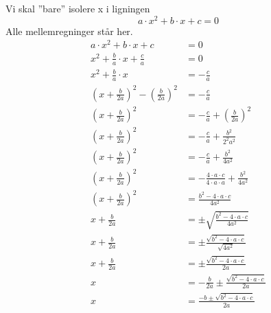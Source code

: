 \documentclass[a4paper, 12pt]{article}
\date{}
\title{}
\begin{document}
Vi skal ''bare'' isolere x i ligningen
$$a\cdot x^2 + b \cdot x + c = 0$$
Alle mellemregninger står her.
\begin{align*}
a\cdot x^2 + b \cdot x + c &= 0 \\
x^2 + \frac{b}{a} \cdot x +\frac{c}{a}&=0  \\
x^2 + \frac{b}{a} \cdot x &= -\frac{c}{a}  \\
\left( x + \frac{b}{2 a} \right)^2 - \left( \frac{b}{2 a} \right)^2 &= - \frac{c}{a} \\
\left( x + \frac{b}{2 a} \right)^2  &= - \frac{c}{a}+\left( \frac{b}{2 a} \right)^2  \\
\left( x + \frac{b}{2 a} \right)^2  &= - \frac{c}{a}+\frac{b^2}{2^2 a^2}   \\
\left( x + \frac{b}{2 a} \right)^2  &= - \frac{c}{a}+\frac{b^2}{4 a^2}   \\
\left( x + \frac{b}{2 a} \right)^2  &= - \frac{4\cdot a \cdot c}{4 \cdot a\cdot a}+\frac{b^2}{4 a^2}   \\
\left( x + \frac{b}{2 a} \right)^2  &= \frac{b^2 -4\cdot a \cdot c}{4 a^2}   \\
x + \frac{b}{2 a}   &= \pm \sqrt{\frac{b^2 -4\cdot a \cdot c}{4 a^2}}   \\
x + \frac{b}{2 a}   &= \pm \frac{\sqrt{b^2 -4\cdot a \cdot c}}{\sqrt{4 a^2}}   \\
x + \frac{b}{2 a}   &= \pm \frac{\sqrt{b^2 -4\cdot a \cdot c}}{2 a}   \\
x    &= -\frac{b}{2 a} \pm \frac{\sqrt{b^2 -4\cdot a \cdot c}}{2 a}   \\
x    &= \frac{- b\pm \sqrt{b^2 -4\cdot a \cdot c}}{2 a}
\end{align*}
\end{document}
